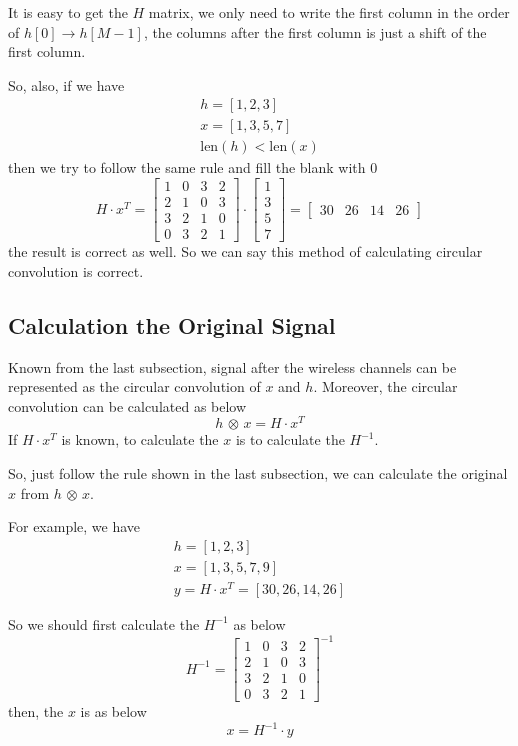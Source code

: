 \documentclass{article}
\begin{document}
It is easy to get the $H$ matrix, we only need to write the first column in the order of $h[0] \to h[M - 1] $, the columns after the first column is just a shift of the first column.

So, also, if we have
\begin{gather*}
	h = [1, 2, 3] \\ 
	x = [1, 3, 5, 7] \\ 
	\mathrm{len}(h) < \mathrm{len}(x)
\end{gather*}
then we try to follow the same rule and fill the blank with $0$
$$
H \cdot x^T =
\begin{bmatrix}
	1 & 0 & 3 & 2 \\ 
	2 & 1 & 0 & 3 \\ 
	3 & 2 & 1 & 0 \\ 
	0 & 3 & 2 & 1
\end{bmatrix}
\cdot 
\begin{bmatrix}
	1 \\ 
	3 \\ 
	5 \\ 
	7
\end{bmatrix}
=
\begin{bmatrix}
	30 & 26 & 14 & 26
\end{bmatrix}
$$
the result is correct as well. So we can say this method of calculating circular convolution is correct.

\subsection{Calculation the Original Signal}
Known from the last subsection, signal after the wireless channels can be represented as the circular convolution of $x$ and $h$. Moreover, the circular convolution can be calculated as below
$$
h \, \otimes \, x = H \cdot x^T
$$
If $H \cdot x^T$ is known, to calculate the $x$ is to calculate the $H^{-1}$.

So, just follow the rule shown in the last subsection, we can calculate the original $x$ from $h \, \otimes \, x$.

For example, we have
\begin{gather*}
	h = [1, 2, 3] \\ 
	x = [1, 3, 5, 7, 9] \\ 
	y = H \cdot x^T = [30 , 26 , 14 , 26]
\end{gather*}

So we should first calculate the $H^{-1}$ as below
$$
H^{-1} = 
\left[ 
\begin{matrix}
	1 & 0 & 3 & 2 \\ 
	2 & 1 & 0 & 3 \\ 
	3 & 2 & 1 & 0 \\ 
	0 & 3 & 2 & 1
\end{matrix}
 \right]^{-1}
$$
then, the $x$ is as below
$$
x = H^{-1} \cdot y
$$
\end{document}
